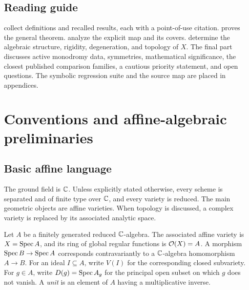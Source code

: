 \subsection{Reading guide}

\begin{roadmap}\label{roadmap:paper}
 collect definitions and recalled results, each with a point-of-use citation.   proves the general theorem.   analyze the explicit map and its covers.   determine the algebraic structure, rigidity, degeneration, and topology of $X$.  The final part discusses active monodromy data, symmetries, mathematical significance, the closest published comparison families, a cautious priority statement, and open questions.  The symbolic regression suite and the source map are placed in appendices.
\end{roadmap}

\section{Conventions and affine-algebraic preliminaries}\label{sec:background}

\subsection{Basic affine language}

\begin{convention}\label{conv:ground-field}
The ground field is $\mathbb C$.  Unless explicitly stated otherwise, every scheme is separated and of finite type over $\mathbb C$, and every variety is reduced.  The main geometric objects are affine varieties.  When topology is discussed, a complex variety is replaced by its associated analytic space.
\end{convention}

\begin{definition}\label{def:affine-variety}
Let $A$ be a finitely generated reduced $\mathbb C$-algebra.  The associated affine variety is $X=\operatorname{Spec} A$, and its ring of global regular functions is $\mathcal O(X)=A$.  A morphism $\operatorname{Spec} B\to\operatorname{Spec} A$ corresponds contravariantly to a $\mathbb C$-algebra homomorphism $A\to B$.  For an ideal $I\subseteq A$, write $V(I)$ for the corresponding closed subvariety.  For $g\in A$, write $D(g)=\operatorname{Spec} A_g$ for the principal open subset on which $g$ does not vanish.  A \emph{unit} is an element of $A$ having a multiplicative inverse.
\end{definition}

